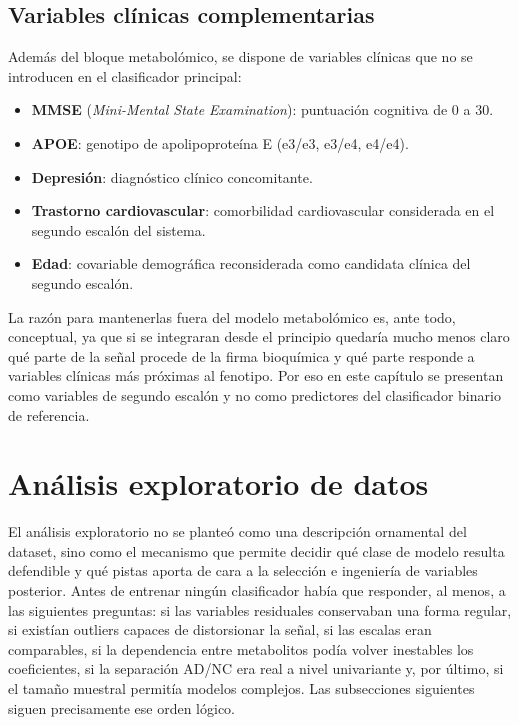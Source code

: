 \subsection{Variables clínicas complementarias}\label{sec:variables_clinicas}

Además del bloque metabolómico, se dispone de variables clínicas que no se introducen en el clasificador principal:

\begin{itemize}
    \item \textbf{MMSE} (\textit{Mini-Mental State Examination}): puntuación cognitiva de 0 a 30.
    \item \textbf{APOE}: genotipo de apolipoproteína E (e3/e3, e3/e4, e4/e4).
    \item \textbf{Depresión}: diagnóstico clínico concomitante.
    \item \textbf{Trastorno cardiovascular}: comorbilidad cardiovascular considerada en el segundo escalón del sistema.
    \item \textbf{Edad}: covariable demográfica reconsiderada como candidata clínica del segundo escalón.
\end{itemize}

La razón para mantenerlas fuera del modelo metabolómico es, ante todo, conceptual, ya que si se integraran desde el
principio quedaría mucho menos claro qué parte de la señal procede de la firma bioquímica y qué parte responde a
variables clínicas más próximas al fenotipo. Por eso en este capítulo se presentan como variables de segundo escalón y
no como predictores del clasificador binario de referencia.

\section{Análisis exploratorio de datos}\label{sec:eda_metodos}

El análisis exploratorio no se planteó como una descripción ornamental del dataset, sino como el mecanismo que permite
decidir qué clase de modelo resulta defendible y qué pistas aporta de cara a la selección e ingeniería de variables
posterior.
Antes de entrenar ningún clasificador había que responder, al menos, a las siguientes preguntas: si las variables
residuales conservaban una forma regular, si existían outliers capaces de distorsionar la señal, si las escalas eran
comparables, si la dependencia entre metabolitos podía volver inestables los coeficientes, si la separación AD/NC era
real a nivel univariante y, por último, si el tamaño muestral permitía modelos complejos. Las subsecciones siguientes
siguen precisamente ese orden lógico.

